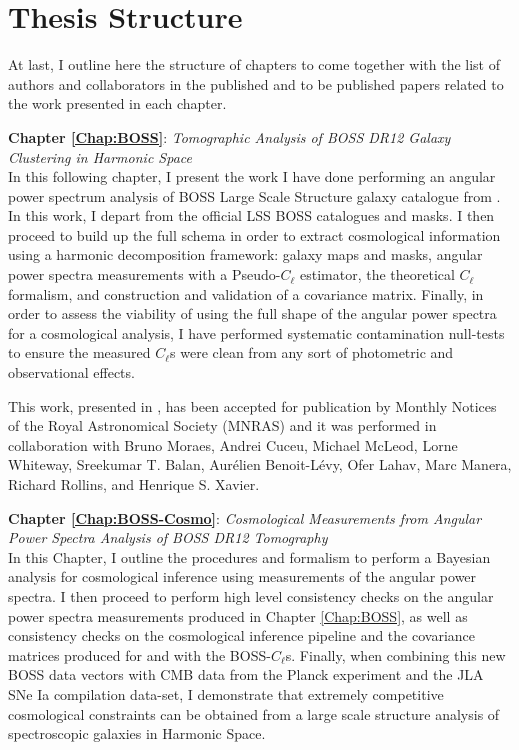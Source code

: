 \section{Thesis Structure}
\label{sec:intro:structure}
At last, I outline here the structure of chapters to come together with the list of authors and collaborators in the published and to be published papers related to the work presented in each chapter.

\textbf{Chapter \ref{Chap:BOSS}}: \textit{Tomographic Analysis of BOSS DR12 Galaxy Clustering in Harmonic Space} \\[0.6em]
In this following chapter, I present the work I have done performing an angular power spectrum analysis of BOSS Large Scale Structure galaxy catalogue from \cite{BOSSCatalogue2016}. In this work, I depart from the official LSS BOSS catalogues and masks. I then proceed to build up the full schema in order to extract cosmological information using a harmonic decomposition framework: galaxy maps and masks, angular power spectra measurements with a Pseudo-$C_{\ell}$ estimator, the theoretical $C_{\ell}$ formalism, and construction and validation of a covariance matrix. Finally, in order to assess the viability of using the full shape of the angular power spectra for a cosmological analysis, I have performed systematic contamination null-tests to ensure the measured $C_{\ell}$s were clean from any sort of photometric and observational effects.

\qquad This work, presented in \cite{2018LoureiroBOSS}, has been accepted for publication by Monthly Notices of the Royal Astronomical Society (MNRAS) and it was performed in collaboration with Bruno Moraes, Andrei Cuceu, Michael McLeod, Lorne Whiteway, Sreekumar T. Balan, Aur\'elien Benoit-L\'evy, Ofer Lahav, Marc Manera, Richard Rollins, and Henrique S. Xavier.

\bigskip

\textbf{Chapter \ref{Chap:BOSS-Cosmo}}: \textit{Cosmological Measurements from Angular Power Spectra Analysis of BOSS DR12 Tomography} \\[0.6em]
 In this Chapter, I outline the procedures and formalism to perform a Bayesian analysis for cosmological inference using measurements of the angular power spectra. I then proceed to perform high level consistency checks on the angular power spectra measurements produced in Chapter \ref{Chap:BOSS}, as well as consistency checks on the cosmological inference pipeline and the covariance matrices produced for and with the BOSS-$C_{\ell}$s. Finally, when combining this new BOSS data vectors with CMB data from the Planck experiment and the JLA SNe Ia compilation data-set, I demonstrate that extremely competitive cosmological constraints can be obtained from a large scale structure analysis of spectroscopic galaxies in Harmonic Space. 

